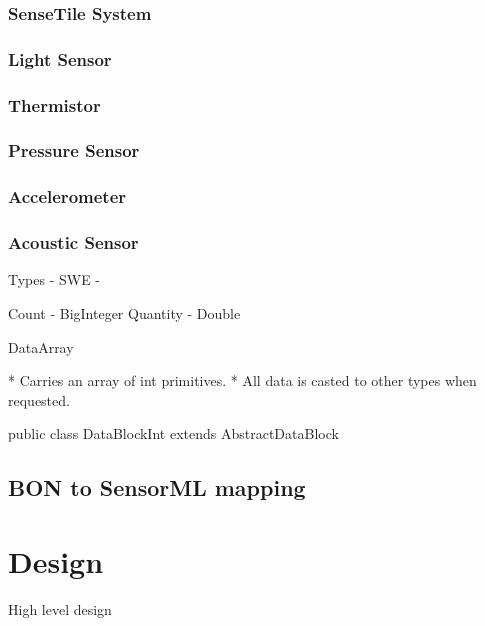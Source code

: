 \documentclass[]{final_report}
\begin{document}
\subsection{SenseTile System}
\subsection{Light Sensor}
\subsection{Thermistor}
\subsection{Pressure Sensor}
\subsection{Accelerometer}
\subsection{Acoustic Sensor}

Types
 - SWE -

Count - BigInteger
Quantity - Double

DataArray

 * Carries an array of int primitives.
 * All data is casted to other types when requested.

public class DataBlockInt extends AbstractDataBlock


\newpage
\section{BON to SensorML mapping}

\chapter{Design}
High level design
\end{document}
